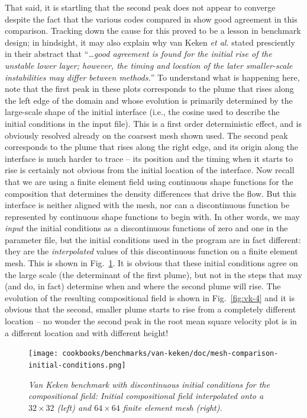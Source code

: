 \documentclass{article}
\begin{document}
That said, it is startling that the second peak does not appear to converge
despite the fact that the various codes compared in \cite{KKSCND97} show good
agreement in this comparison. Tracking down the cause for this proved to be a
lesson in benchmark design; in hindsight, it may also explain why van Keken
\textit{et al.} stated presciently in their abstract that ``\textit{\ldots good
agreement is found for the initial rise of the unstable lower layer; however, the timing
  and location of the later smaller-scale instabilities may differ between
  methods.}''
To understand what is happening here, note that the first peak in these plots
corresponds to the plume that rises along the left edge of the domain and whose
evolution is primarily determined by the large-scale shape of the initial
interface (i.e., the cosine used to describe the initial conditions in the
input file). This is a first order deterministic effect, and is obviously
resolved already on the coarsest mesh shown used. The second peak corresponds to
the plume that rises along the right edge, and its origin along the interface is
much harder to trace -- its position and the timing when it starts to rise is
certainly not obvious from the initial location of the interface. Now recall
that we are using a finite element field using continuous shape functions for
the composition that determines the density differences that drive the flow. But
this interface is neither aligned with the mesh, nor can a discontinuous
function be represented by continuous shape functions to begin with. In other
words, we may \textit{input} the initial conditions as a discontinuous functions
of zero and one in the parameter file, but the initial conditions used in the
program are in fact different: they are the \textit{interpolated} values of this
discontinuous function on a finite element mesh. This is shown in
Fig.~\ref{fig:vk-3}. It is obvious that these initial conditions agree on the
large scale (the determinant of the first plume), but not in the steps that may
(and do, in fact) determine when and where the second plume will rise. The
evolution of the resulting compositional field is shown in Fig.~\ref{fig:vk-4}
and it is obvious that the second, smaller plume starts to rise from a
completely different location -- no wonder the second peak in the root mean
square velocity plot is in a different location and with different height!

\begin{figure}
  \centering
  \texttt{[image: cookbooks/benchmarks/van-keken/doc/mesh-comparison-initial-conditions.png]}
  \caption{\it Van Keken benchmark with discontinuous initial conditions for the
  compositional field:
  Initial compositional field interpolated onto a $32\times 32$ (left) and
  $64\times 64$ finite element mesh (right).}
  \label{fig:vk-3}
\end{figure}
\end{document}
